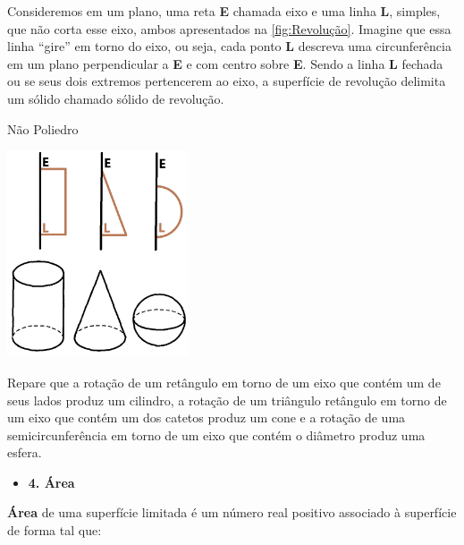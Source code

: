 Consideremos em um plano, uma reta \textbf{E} chamada eixo e uma linha \textcolor[HTML]{B97A57}{\textbf{L}}, simples, que não corta esse eixo, ambos apresentados na \autoref{fig:Revolução}. Imagine que essa linha ``gire'' em torno do eixo, ou seja, cada ponto \textcolor[HTML]{B97A57}{\textbf{L}} descreva uma circunferência em um plano perpendicular a \textbf{E} e com centro sobre \textbf{E}. Sendo a linha \textcolor[HTML]{B97A57}{\textbf{L}} fechada ou se seus dois extremos pertencerem ao eixo, a superfície de revolução delimita um sólido chamado sólido de revolução.

\begin{CenteredFigure}
    \caption{Não Poliedro} \label{fig:Revolução}
    \includegraphics[width=0.4\textwidth]{Imagens/Novas/Revolução}
\end{CenteredFigure}

Repare que a rotação de um retângulo em torno de um eixo que contém um de seus lados produz um cilindro, a rotação de um triângulo retângulo em torno de um eixo que contém um dos catetos produz um cone e a rotação de uma semicircunferência em torno de um eixo que contém o diâmetro produz uma esfera.


\begin{itemize}
    \item \textbf{4. Área}
\end{itemize}


\textbf{Área} de uma superfície limitada é um número real positivo associado à superfície de forma tal que:

